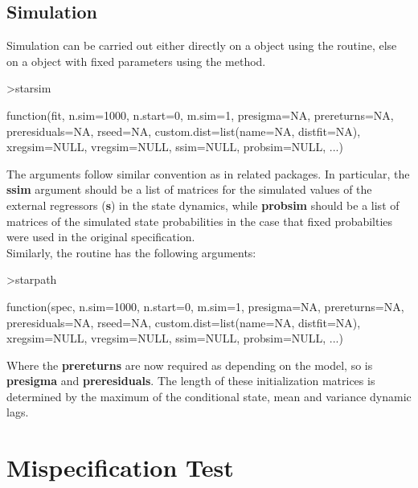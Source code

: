\subsection{Simulation}
Simulation can be carried out either directly on a  object using
the  routine, else on a  object with fixed
parameters using the  method.

\begin{Schunk}
\begin{Sinput}
>starsim
\end{Sinput}
\begin{Soutput}
function(fit, n.sim=1000, n.start=0, m.sim=1, presigma=NA, prereturns=NA, 
preresiduals=NA, rseed=NA, custom.dist=list(name=NA, distfit=NA), 
xregsim=NULL, vregsim=NULL, ssim=NULL, probsim=NULL, ...)
\end{Soutput}
\end{Schunk}
The arguments follow similar convention as in related packages. In particular,
the \textbf{ssim} argument should be a list of matrices for the
simulated values of the external regressors (\textbf{s}) in the state dynamics,
while \textbf{probsim} should be a list of matrices of the simulated state
probabilities in the case that fixed probabilties were used in the original
specification.
\\
Similarly, the  routine has the following arguments:
\begin{Schunk}
\begin{Sinput}
>starpath
\end{Sinput}
\begin{Soutput}
function(spec, n.sim=1000, n.start=0, m.sim=1, presigma=NA, prereturns=NA, 
preresiduals=NA, rseed=NA, custom.dist=list(name=NA, distfit=NA), 
xregsim=NULL, vregsim=NULL, ssim=NULL, probsim=NULL, ...)
\end{Soutput}
\end{Schunk}
Where the \textbf{prereturns} are now required as depending on the model, so is
\textbf{presigma} and \textbf{preresiduals}. The length of these initialization
matrices is determined by the maximum of the conditional state, mean and
variance dynamic lags.

\section{Mispecification Test}\label{sec:6}
